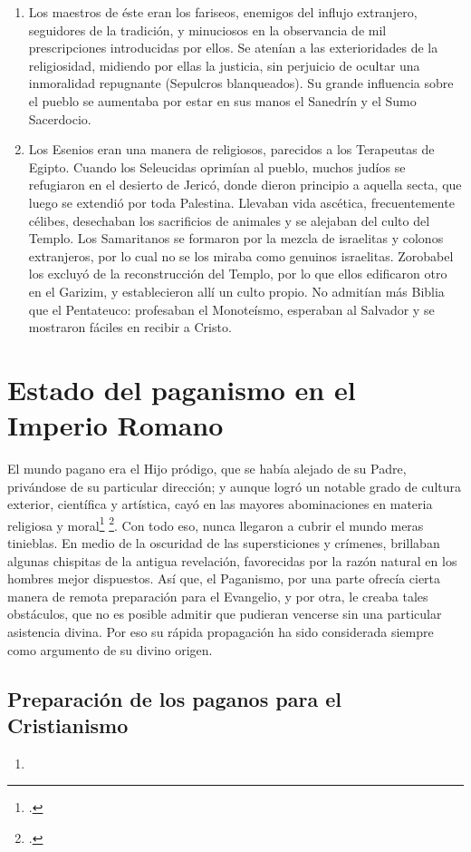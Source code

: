 \raggedbottom{} \documentclass[12pt, a4paper]{book}
\begin{document}
\begin{enumerate}
\begin{enumerate}
    \item Los maestros de éste eran los fariseos, enemigos del influjo extranjero, seguidores de la tradición, y minuciosos en la observancia de mil prescripciones introducidas por ellos. Se atenían a las exterioridades de la religiosidad, midiendo por ellas la justicia, sin perjuicio de ocultar una inmoralidad repugnante (Sepulcros blanqueados). Su grande influencia sobre el pueblo se aumentaba por estar en sus manos el Sanedrín y el Sumo Sacerdocio.
    \item Los Esenios eran una manera de religiosos, parecidos a los Terapeutas de Egipto. Cuando los Seleucidas oprimían al pueblo, muchos judíos se refugiaron en el desierto de Jericó, donde dieron principio a aquella secta, que luego se extendió por toda Palestina. Llevaban vida ascética, frecuentemente célibes, desechaban los sacrificios de animales y se alejaban del culto del Templo. Los Samaritanos se formaron por la mezcla de israelitas y colonos extranjeros, por lo cual no se los miraba como genuinos israelitas. Zorobabel los excluyó de la reconstrucción del Templo, por lo que ellos edificaron otro en el Garizim, y establecieron allí un culto propio. No admitían más Biblia que el Pentateuco: profesaban el Monoteísmo, esperaban al Salvador y se mostraron fáciles en recibir a Cristo.
  \end{enumerate}
\end{enumerate}
\section{Estado del paganismo en el Imperio Romano}
El mundo pagano era el Hijo pródigo, que se había alejado de su Padre, privándose de su particular dirección; y aunque logró un notable grado de cultura exterior, científica y artística, cayó en las mayores abominaciones en materia religiosa y moral\footcite{Eusebius313Preparatio} \footcite{SanAgustin426DeCivitate}.
Con todo eso, nunca llegaron a cubrir el mundo meras tinieblas. En medio de la oscuridad de las supersticiones y crímenes, brillaban algunas chispitas de la antigua revelación, favorecidas por la razón natural en los hombres mejor dispuestos. Así que, el Paganismo, por una parte ofrecía cierta manera de remota preparación para el Evangelio, y por otra, le creaba tales obstáculos, que no es posible admitir que pudieran vencerse sin una particular asistencia divina. Por eso su rápida propagación ha sido considerada siempre como argumento de su divino origen.
\subsection{Preparación de los paganos para el Cristianismo}
\begin{enumerate}
  \item 
\end{enumerate}
\end{document}
